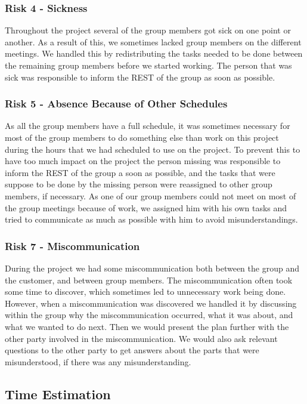 \documentclass[../document]{subfiles}
\begin{document}
\subsubsection{Risk 4 - Sickness}
Throughout the project several of the group members got sick on one point or another. As a result of this, we sometimes lacked group members on the different meetings. We handled this by redistributing the tasks needed to be done between the remaining group members before we started working. The person that was sick was responsible to inform the \gls{REST} of the group as soon as possible. 

\subsubsection{Risk 5 - Absence Because of Other Schedules}
As all the group members have a full schedule, it was sometimes necessary for most of the group members to do something else than work on this project during the hours that we had scheduled to use on the project. To prevent this to have too much impact on the project the person missing was responsible to inform the \gls{REST} of the group a soon as possible, and the tasks that were suppose to be done by the missing person were reassigned to other group members, if necessary. As one of our group members could not meet on most of the group meetings because of work, we assigned him with his own tasks and tried to communicate as much as possible with him to avoid misunderstandings. 

\subsubsection{Risk 7 - Miscommunication}
During the project we had some miscommunication both between the group and the customer, and between group members. The miscommunication often took some time to discover, which sometimes led to unnecessary work being done. However, when a miscommunication was discovered we handled it by discussing within the group why the miscommunication occurred, what it was about, and what we wanted to do next. Then we would present the plan further with the other party involved in the miscommunication. We would also ask relevant questions to the other party to get answers about the parts that were misunderstood, if there was any misunderstanding. 

\subsection{Time Estimation}
\end{document}
